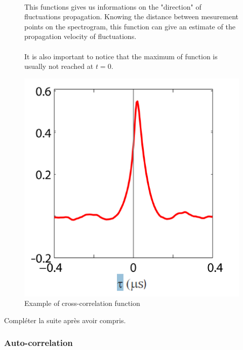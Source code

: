\begin{figure}[h]
    \begin{minipage}{0.5\textwidth} 
        \paragraph{}
        This functions gives us informations on the "direction" of fluctuations propagation. Knowing the distance between mesurement points on the spectrogram, this function can give an estimate of the propagation velocity of fluctuations. 
        
        \paragraph{}
        It is also important to notice that the maximum of function is usually not reached at \(t=0\). 
    \end{minipage}
    \begin{minipage}{0.5\textwidth}
        \centering
        \includegraphics[scale=0.65]{Figures Cours Traitement du Signal/Cross-correlation function.png}
        \caption{Example of cross-correlation function}
        \label{fig:example_cross-correlation_function}
    \end{minipage}
\end{figure}

Compléter la suite après avoir compris.  
\newpage

\subsubsection{Auto-correlation}

